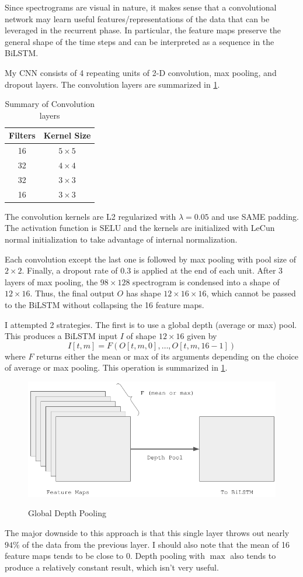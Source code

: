 \documentclass[11pt,a4paper]{article}
\begin{document}
Since spectrograms are visual in nature, it makes sense that a convolutional network may learn useful features/representations of the data that can be leveraged in the recurrent phase. In particular, the feature maps preserve the general shape of the time steps and can be interpreted as a sequence in the BiLSTM.

My CNN consists of 4 repeating units of 2-D convolution, max pooling, and dropout layers. The convolution layers are summarized in \cref{tab:conv}.
\begin{table}[h]
  \centering
  \caption{Summary of Convolution layers}
  \begin{tabular}{c|c}
    Filters & Kernel Size    \\
    \hline
    16      & \(5 \times 5\) \\
    32      & \(4 \times 4\) \\
    32      & \(3 \times 3\) \\
    16      & \(3 \times 3\)
  \end{tabular}
  \label{tab:conv}
\end{table}
The convolution kernels are L2 regularized with \(\lambda = 0.05\) and use SAME padding. The activation function is SELU and the kernels are initialized with LeCun normal initialization to take advantage of internal normalization.

Each convolution except the last one is followed by max pooling with pool size of \(2 \times 2\). Finally, a dropout rate of 0.3 is applied at the end of each unit. After 3 layers of max pooling, the \(98 \times 128\) spectrogram is condensed into a shape of \(12 \times 16\). Thus, the final output \(O\) has shape \(12 \times 16 \times 16\), which cannot be passed to the BiLSTM without collapsing the 16 feature maps.

I attempted 2 strategies. The first is to use a global depth (average or max) pool. This produces a BiLSTM input \(I\) of shape \(12 \times 16\) given by
\begin{equation}
  I[t, m] = F(O[t, m, 0], \dotsc, O[t, m, 16 - 1])
\end{equation}
where \(F\) returns either the mean or max of its arguments depending on the choice of average or max pooling. This operation is summarized in \cref{fig:global_pool}.
\begin{figure}[h]
  \centering
  \caption{Global Depth Pooling}
  \includegraphics[width=.48\textwidth]{global_pool.png}
  \label{fig:global_pool}
\end{figure}
The major downside to this approach is that this single layer throws out nearly \(94\%\) of the data from the previous layer. I should also note that the mean of 16 feature maps tends to be close to 0. Depth pooling with \(\max\) also tends to produce a relatively constant result, which isn't very useful.
\end{document}
